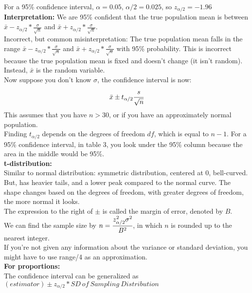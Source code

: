 \documentclass[12pt]{article}
\begin{document}
For a 95\% confidence interval, $\alpha = 0.05$, $\alpha/2 = 0.025$, so  $z_{\alpha/2} = -1.96$ \\

\noindent \textbf{Interpretation:} We are 95\% confident that the true population mean is between $\bar{x}-z_{\alpha/2}*\frac{\sigma}{\sqrt{n}}$ and $\bar{x}+z_{\alpha/2}*\frac{\sigma}{\sqrt{n}}$.\\

\noindent Incorrect, but common misinterpretation: The true population mean falls in the range $\bar{x}-z_{\alpha/2}*\frac{\sigma}{\sqrt{n}}$ and $\bar{x}+z_{\alpha/2}*\frac{\sigma}{\sqrt{n}}$ with 95\% probability. This is incorrect because the true population mean is fixed and  doesn't change (it isn't random). Instead, $\bar{x}$ is the random variable. \\

\noindent Now suppose you don't know $\sigma$, the confidence interval is now:
$$\bar{x} \pm t_{\alpha/2}\cfrac{s}{\sqrt{n}} $$
This assumes that you have $n > 30$, or if you have an approximately normal population.\\
Finding $t_{\alpha/2}$ depends on the degrees of freedom $df$, which is equal to $n-1$. For a 95\% confidence interval, in table 3, you look under the 95\% column because the area in the middle would be 95\%.\\

\noindent \textbf{t-distribution:}\\
Similar to normal distribution: symmetric distribution, centered at 0, bell-curved. But, has heavier tails, and a lower peak compared to the normal curve. The shape changes based on the degrees of freedom, with greater degrees of freedom, the more normal it looks.\\
The expression to the right of $\pm$ is called the margin of error, denoted by $B$.\\
We can find the sample size by $n=\cfrac{z_{\alpha/2}^{2}\sigma^{2}}{B^{2}}$, in which $n$ is rounded up to the nearest integer. \\

If you're not given any information about the variance or standard deviation, you might have to use range/4 as an approximation.\\

\noindent \textbf{For proportions:}\\
The confidence interval can be generalized as $(estimator) \pm z_{\alpha/2}*SD\ of\ Sampling\ Distribution$\\
\end{document}
